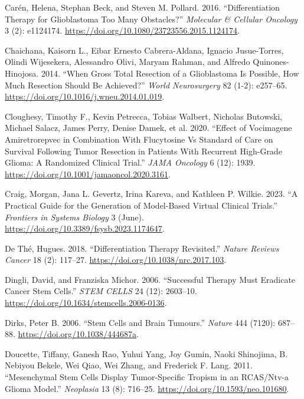 \documentclass[
  default,
]{sn-jnl}
\newlength{\cslhangindent}
\newenvironment{CSLReferences}[2] %
 {\begin{list}{}{%
  \setlength{\itemindent}{0pt}
  \setlength{\leftmargin}{0pt}
  \setlength{\parsep}{0pt}
  \ifodd #1
   \setlength{\leftmargin}{\cslhangindent}
   \setlength{\itemindent}{-1\cslhangindent}
  \fi
  \setlength{\itemsep}{#2\baselineskip}}}
 {\end{list}}
\begin{document}
\begin{CSLReferences}{1}{0}
Carén, Helena, Stephan Beck, and Steven M. Pollard. 2016.
{``Differentiation Therapy for Glioblastoma {\textendash} Too Many
Obstacles?''} \emph{Molecular \& Cellular Oncology} 3 (2): e1124174.
\url{https://doi.org/10.1080/23723556.2015.1124174}.

Chaichana, Kaisorn L., Eibar Ernesto Cabrera-Aldana, Ignacio
Jusue-Torres, Olindi Wijesekera, Alessandro Olivi, Maryam Rahman, and
Alfredo Quinones-Hinojosa. 2014. {``When Gross Total Resection of a
Glioblastoma Is Possible, How Much Resection Should Be Achieved?''}
\emph{World Neurosurgery} 82 (1-2): e257--65.
\url{https://doi.org/10.1016/j.wneu.2014.01.019}.

Cloughesy, Timothy F., Kevin Petrecca, Tobias Walbert, Nicholas
Butowski, Michael Salacz, James Perry, Denise Damek, et al. 2020.
{``Effect of Vocimagene Amiretrorepvec in Combination With Flucytosine
Vs Standard of Care on Survival Following Tumor Resection in Patients
With Recurrent High-Grade Glioma: A Randomized Clinical Trial.''}
\emph{JAMA Oncology} 6 (12): 1939.
\url{https://doi.org/10.1001/jamaoncol.2020.3161}.

Craig, Morgan, Jana L. Gevertz, Irina Kareva, and Kathleen P. Wilkie.
2023. {``A Practical Guide for the Generation of Model-Based Virtual
Clinical Trials.''} \emph{Frontiers in Systems Biology} 3 (June).
\url{https://doi.org/10.3389/fsysb.2023.1174647}.

De Thé, Hugues. 2018. {``Differentiation Therapy Revisited.''}
\emph{Nature Reviews Cancer} 18 (2): 117--27.
\url{https://doi.org/10.1038/nrc.2017.103}.

Dingli, David, and Franziska Michor. 2006. {``Successful Therapy Must
Eradicate Cancer Stem Cells.''} \emph{STEM CELLS} 24 (12): 2603--10.
\url{https://doi.org/10.1634/stemcells.2006-0136}.

Dirks, Peter B. 2006. {``Stem Cells and Brain Tumours.''} \emph{Nature}
444 (7120): 687--88. \url{https://doi.org/10.1038/444687a}.

Doucette, Tiffany, Ganesh Rao, Yuhui Yang, Joy Gumin, Naoki Shinojima,
B. Nebiyou Bekele, Wei Qiao, Wei Zhang, and Frederick F. Lang. 2011.
{``Mesenchymal Stem Cells Display Tumor-Specific Tropism in an
RCAS/Ntv-a Glioma Model.''} \emph{Neoplasia} 13 (8): 716--25.
\url{https://doi.org/10.1593/neo.101680}.


\end{CSLReferences}
\end{document}
